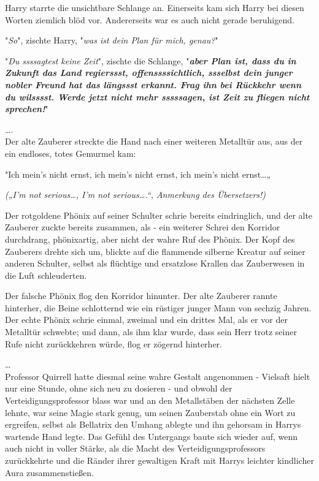 {Harry starrte die unsichtbare Schlange an. Einerseits kam sich Harry bei diesen Worten ziemlich blöd vor. Andererseits war es auch nicht gerade beruhigend.

"\emph{So}", zischte Harry, "\emph{was ist dein Plan für mich, genau?}"

"\emph{Du ssssagtest keine Zeit}", zischte die Schlange, "\textbf{\emph{aber Plan ist, dass du in Zukunft das Land regierssst, offenssssichtlich, ssselbst dein junger nobler Freund hat das längssst erkannt. Frag ihn bei Rückkehr wenn du wilsssst. Werde jetzt nicht mehr sssssagen, ist Zeit zu fliegen nicht sprechen!}}"

….\\ Der alte Zauberer streckte die Hand nach einer weiteren Metalltür aus, aus der ein endloses, totes Gemurmel kam:

"Ich mein's nicht ernst, ich mein's nicht ernst, ich mein's nicht ernst…„

\emph{(„I'm not serious…, I'm not serious….“, Anmerkung des Übersetzers!)}

Der rotgoldene Phönix auf seiner Schulter schrie bereits eindringlich, und der alte Zauberer zuckte bereits zusammen, als - ein weiterer Schrei den Korridor durchdrang, phönixartig, aber nicht der wahre Ruf des Phönix. Der Kopf des Zauberers drehte sich um, blickte auf die flammende silberne Kreatur auf seiner anderen Schulter, selbst als flüchtige und ersatzlose Krallen das Zauberwesen in die Luft schleuderten.

Der falsche Phönix flog den Korridor hinunter. Der alte Zauberer rannte hinterher, die Beine schlotternd wie ein rüstiger junger Mann von sechzig Jahren. Der echte Phönix schrie einmal, zweimal und ein drittes Mal, als er vor der Metalltür schwebte; und dann, als ihm klar wurde, dass sein Herr trotz seiner Rufe nicht zurückkehren würde, flog er zögernd hinterher.

…\\ Professor Quirrell hatte diesmal seine wahre Gestalt angenommen - Vielsaft hielt nur eine Stunde, ohne sich neu zu dosieren - und obwohl der Verteidigungsprofessor blass war und an den Metallstäben der nächsten Zelle lehnte, war seine Magie stark genug, um seinen Zauberstab ohne ein Wort zu ergreifen, selbst als Bellatrix den Umhang ablegte und ihn gehorsam in Harrys wartende Hand legte. Das Gefühl des Untergangs baute sich wieder auf, wenn auch nicht in voller Stärke, als die Macht des Verteidigungsprofessors zurückkehrte und die Ränder ihrer gewaltigen Kraft mit Harrys leichter kindlicher Aura zusammenstießen.

}
